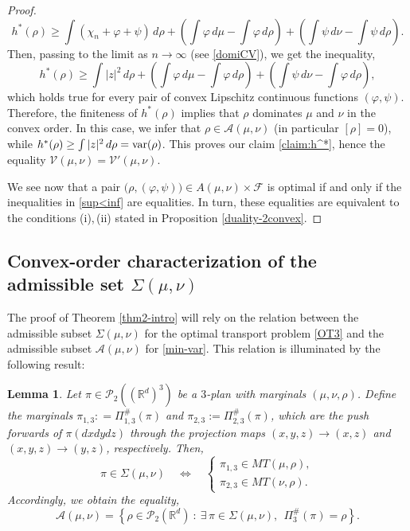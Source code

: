\documentclass[11pt,letterpaper,reqno]{amsart}
\newtheorem{lemma}[theorem]{Lemma}
\theoremstyle{definition}
\numberwithin{equation}{section}
\def\f{\varphi}
\newcommand{\R}{\mathbb{R}}
\newcommand{\Rd}{\R^d}
\newcommand{\A}{\mathcal{A}}
\newcommand{\FF}{\mathcal{F}}
\newcommand{\var}{{\rm{var}}}
\newcommand{\PP}{\mathcal{P}}
\newcommand{\V}{{\mathcal{V}}}
\begin{document}
{\begin{proof}
$$h^*(\rho) \ge \int (\chi_n + \f+\psi)\, d\rho + \left(\int \f\, d\mu - \int \f \, d\rho\right) + \left(\int \psi \, d\nu - \int \psi \, d\rho\right).$$
Then, passing to the limit as $n\to\infty$ (see \eqref{domiCV}), we get the inequality,
 $$h^*(\rho) \ge \int |z|^2\, d\rho +  \left(\int \f\, d\mu - \int \f \, d\rho\right) + \left(\int \psi \, d\nu - \int \f \, d\rho\right) ,$$
which holds true for every pair of convex Lipschitz continuous functions $(\f,\psi)$. Therefore, the finiteness of $h^*(\rho)$ implies that $\rho$ dominates $\mu$ and $\nu$ in the convex order. In this case, we infer that $\rho\in\A(\mu,\nu)$ (in particular $[\rho] = 0$), while   $h^*(\rho)\ge  \int |z|^2\, d\rho =\var(\rho)$.
 This proves our claim \eqref{claim:h^*}, hence the equality $\V(\mu,\nu)=\V'(\mu,\nu)$. 
 
 We see now that  a pair $\big(\rho,(\f,\psi)\big) \in A(\mu,\nu)\times \FF$ is optimal if and only if  the inequalities in \eqref{sup<inf} are  equalities. In turn, these equalities are equivalent to the conditions (i),\,(ii) stated in Proposition \ref{duality-2convex}.
 \end{proof}
  



\subsection{ Convex-order characterization of the admissible set $\Sigma(\mu,\nu)$} The proof of Theorem \ref{thm2-intro} will rely on the relation between the admissible subset $\Sigma(\mu,\nu)$
for the  optimal transport problem \eqref{OT3} and the admissible subset $\A(\mu,\nu)$ for \eqref{min-var}.
This relation is illuminated by the following result:
\begin{lemma}\label{Sigmamunu=Amunu} Let $\pi\in \PP_2((\Rd)^3)$ be a $3$-plan with marginals $(\mu,\nu,\rho)$. Define the marginals $\pi_{1,3} : =\Pi_{1,3}^\#(\pi)$ and $\pi_{2,3} :=\Pi_{2,3}^\#(\pi)$, which are the push forwards of $\pi(dxdydz)$ through the projection maps $(x,y,z)\to (x,z)$ and $(x,y,z)\to (y,z)$, respectively.  
Then,
\begin{equation}\label{equival}
\pi\in \Sigma(\mu,\nu) \quad \Leftrightarrow \quad  \begin{cases} \pi_{1,3} \in MT(\mu,\rho), \\
  \pi_{2,3} \in MT(\nu,\rho). \end{cases}
\end{equation}
Accordingly, we obtain the equality,
\begin{equation}\label{Sigma=A}
\A(\mu,\nu) = \left\{ \rho \in \PP_2(\R^d)\ :\ \exists\, \pi\in  \Sigma(\mu,\nu), \ \ \Pi_3^\#(\pi) =\rho \right\} .
 \end{equation}
  

\end{lemma}}
\end{document}
